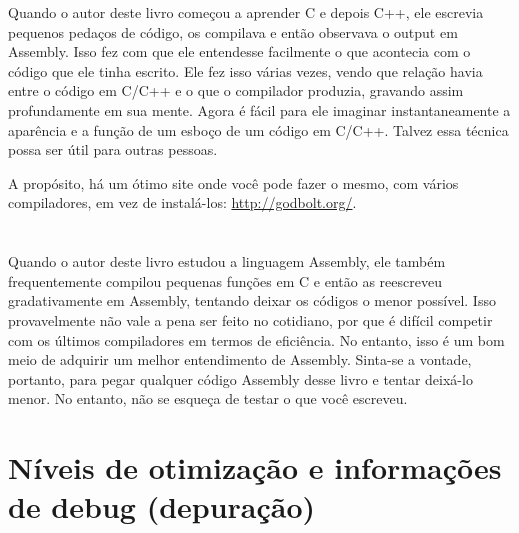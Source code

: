 
Quando o autor deste livro começou a aprender C e depois C++, ele escrevia pequenos pedaços de código, os compilava e então observava o output em Assembly. Isso fez com que ele entendesse facilmente o que acontecia com o código que ele tinha escrito. Ele fez isso várias vezes, vendo que  relação havia entre o código em C/C++ e o que o compilador produzia, gravando assim profundamente em sua mente. Agora é fácil para ele imaginar instantaneamente a aparência e a função de um esboço de um código em C/C++. Talvez essa técnica possa ser útil para outras pessoas.

A propósito, há um ótimo site onde você pode fazer o mesmo, com vários compiladores, em vez de instalá-los: \url{http://godbolt.org/}.

\section*{\Exercises}

Quando o autor deste livro estudou a linguagem Assembly, ele também frequentemente compilou pequenas funções em C e então as reescreveu gradativamente em Assembly, tentando deixar os códigos o menor possível. Isso provavelmente não vale a pena ser feito no cotidiano, por que é difícil competir com os últimos compiladores em termos de eficiência. No entanto, isso é um bom meio de adquirir um melhor entendimento de Assembly. Sinta-se a vontade, portanto, para pegar qualquer código Assembly desse livro e tentar deixá-lo menor. No entanto, não se esqueça de testar o que você escreveu.

\section*{Níveis de otimização e informações de debug (depuração)}

